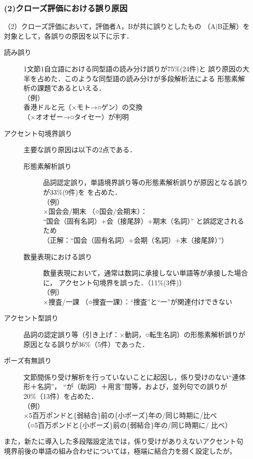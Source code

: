 \vspace{2mm}
\subsubsection{(2)クローズ評価における誤り原因}
（2）クローズ評価において，評価者A，Bが共に誤りとしたもの
（A$\mid$B正解）を対象として，各誤りの原因を以下に示す．
\begin{description}
\item[読み誤り]1文節1自立語における同型語の読み分け誤りが75\%(24件)と
誤り原因の大半を占めた．このような同型語の読み分けが多段解析法による
形態素解析の課題であるといえる．
\\
（例）\\
\hspace*{1cm}香港ドルと{\dg 元}（×モト→○ゲン）の交換\\
\hspace*{1cm}{\dg 大勢}（×オオゼー→○タイセー）が判明
\item[アクセント句境界誤り]主要な誤り原因は以下の2点である．
\begin{description}
\item[形態素解析誤り]
品詞認定誤り，単語境界誤り等の形態素解析誤りが原因となる誤りが33\%(9件)を
を占めた．\\
（例）\\
\hspace*{1cm}×国会会/期末 （○国会/会期末）：\\
\hspace*{1.5cm}``国会（固有名詞）+会（接尾辞）+期末（名詞）\hspace{-2mm}''
と誤認定されるため\\
\hspace*{1.5cm}（正解：``国会（固有名詞）+会期（名詞）+末（接尾辞）''）
\item[数量表現における誤り]
数量表現において，通常は数詞に承接しない単語等が承接した場合に，
アクセント句境界を誤った．（11\%(3件)）\\
（例）\\
\hspace*{1cm}×捜査/一課 （○捜査一課）：``捜査''と``一''が関連付けできない
\end{description}
\item[アクセント型誤り]
品詞の認定誤り等（引き上げ：×動詞，○転生名詞）の形態素解析誤りが
原因となる誤りが36\%（5件）であった．
\item[ポーズ有無誤り]
文節間係り受け解析を行っていないことに起因し，係り受けのない``連体形＋名詞''，
``が（助詞）＋用言''間等，および，並列句での誤りが20\%（13件）を占めた．\\
（例）\\
\hspace*{1cm}×5百万ポンドと\{弱結合\}前の\{小ポーズ\}年の/同じ時期に/比べ\\
\hspace*{1cm}（○5百万ポンドと\{小ポーズ\}前の\{弱結合\}年の/同じ時期に/
比べ）
\end{description}
また，新たに導入した多段階設定法では，係り受けがありえないアクセント句
境界前後の単語の組み合わせについては，極端に結合力を弱く設定したが，

